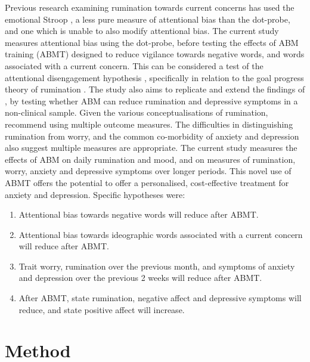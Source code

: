 \documentclass[man,floatsintext,a4paper,biblatex]{apa6}\usepackage[]{graphicx}\usepackage[]{color}
\begin{document}
Previous research examining rumination towards current concerns has used
the emotional Stroop \parencite{williams_cognitive_1997}, a less pure
measure of attentional bias than the dot-probe, and one which is unable to
also modify attentional bias. The current study measures attentional bias
using the dot-probe, before testing the effects of ABM training (ABMT)
designed to reduce vigilance towards negative words, and words associated
with a current concern. This can be considered a test of the attentional
disengagement hypothesis \parencite{koster_understanding_2011},
specifically in relation to the goal progress theory of rumination
\parencite{martin_ruminative_1996}. The study also aims to replicate
and extend the findings of \textcite{yang_attention_2015}, by
testing whether ABM can reduce rumination and depressive symptoms
in a non-clinical sample. Given the various conceptualisations of
rumination, \textcite{smith_roadmap_2009} recommend using multiple outcome
measures. The difficulties in distinguishing rumination from worry, and
the common co-morbidity of anxiety and depression also suggest multiple
measures are appropriate. The current study measures the effects of
ABM on daily rumination and mood, and on measures of rumination, worry,
anxiety and depressive symptoms over longer periods. This novel use of
ABMT offers the potential to offer a personalised, cost-effective
treatment for anxiety and depression. Specific hypotheses were:

\begin{enumerate}

\item Attentional bias towards negative words will reduce after ABMT. 

\item Attentional bias towards ideographic words associated with a
current concern will reduce after ABMT. 

\item Trait worry, rumination over the previous month, and symptoms
of anxiety and depression over the previous 2 weeks will reduce after
ABMT. 

\item After ABMT, state rumination, negative affect and depressive
symptoms will reduce, and state positive affect will increase.

\end{enumerate}

\section{Method}
\end{document}
